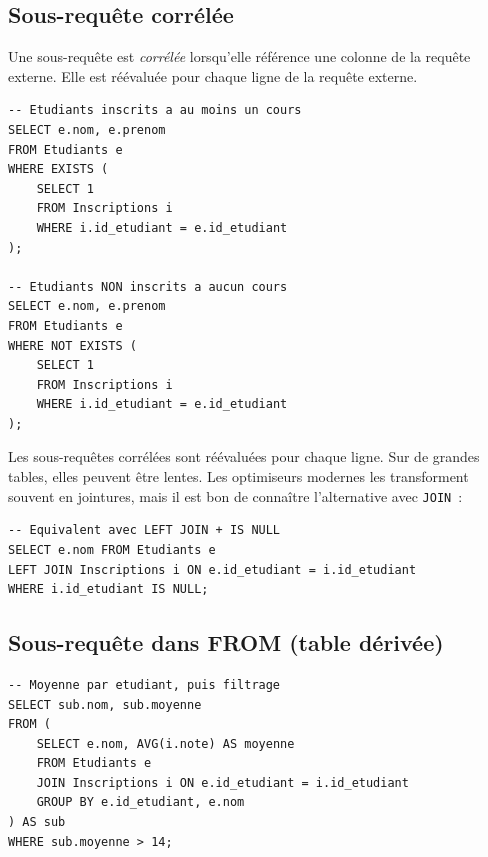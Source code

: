 \subsection{Sous-requ\^ete corr\'el\'ee}

\begin{definition}
Une sous-requ\^ete est \emph{corr\'el\'ee} lorsqu'elle r\'ef\'erence une colonne
de la requ\^ete externe. Elle est r\'e\'evalu\'ee pour chaque ligne de la
requ\^ete externe.
\end{definition}

\begin{codeblock}[title=\textbf{Sous-requ\^ete corr\'el\'ee avec EXISTS}]
\begin{verbatim}
-- Etudiants inscrits a au moins un cours
SELECT e.nom, e.prenom
FROM Etudiants e
WHERE EXISTS (
    SELECT 1
    FROM Inscriptions i
    WHERE i.id_etudiant = e.id_etudiant
);

-- Etudiants NON inscrits a aucun cours
SELECT e.nom, e.prenom
FROM Etudiants e
WHERE NOT EXISTS (
    SELECT 1
    FROM Inscriptions i
    WHERE i.id_etudiant = e.id_etudiant
);
\end{verbatim}
\end{codeblock}

\begin{attention}[title=\textbf{Performance des sous-requ\^etes corr\'el\'ees}]
Les sous-requ\^etes corr\'el\'ees sont r\'e\'evalu\'ees pour chaque ligne.
Sur de grandes tables, elles peuvent \^etre lentes. Les optimiseurs
modernes les transforment souvent en jointures, mais il est bon de
conna\^itre l'alternative avec \texttt{JOIN}~:
\begin{verbatim}
-- Equivalent avec LEFT JOIN + IS NULL
SELECT e.nom FROM Etudiants e
LEFT JOIN Inscriptions i ON e.id_etudiant = i.id_etudiant
WHERE i.id_etudiant IS NULL;
\end{verbatim}
\end{attention}

\subsection{Sous-requ\^ete dans FROM (table d\'eriv\'ee)}

\begin{codeblock}[title=\textbf{Sous-requ\^ete dans FROM}]
\begin{verbatim}
-- Moyenne par etudiant, puis filtrage
SELECT sub.nom, sub.moyenne
FROM (
    SELECT e.nom, AVG(i.note) AS moyenne
    FROM Etudiants e
    JOIN Inscriptions i ON e.id_etudiant = i.id_etudiant
    GROUP BY e.id_etudiant, e.nom
) AS sub
WHERE sub.moyenne > 14;
\end{verbatim}
\end{codeblock}

